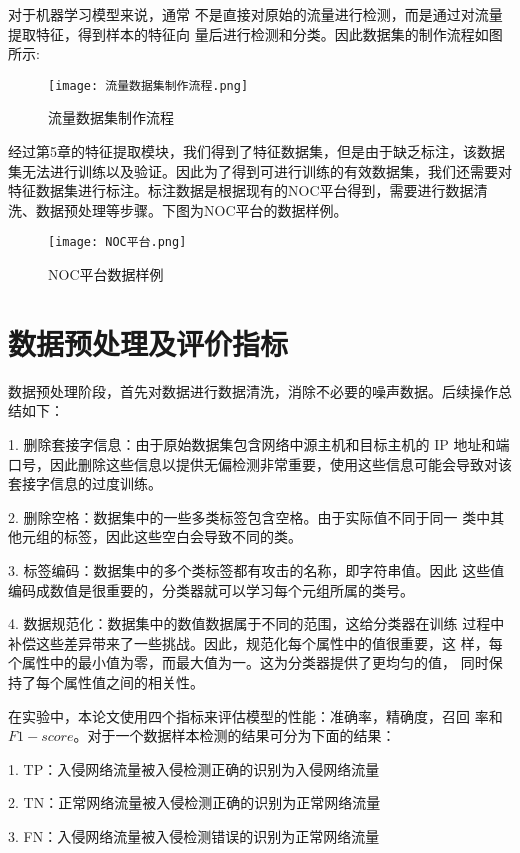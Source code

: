  对于机器学习模型来说，通常
  不是直接对原始的流量进行检测，而是通过对流量提取特征，得到样本的特征向
  量后进行检测和分类。因此数据集的制作流程如图所示:
  \begin{figure}
    \centering
    \texttt{[image: 流量数据集制作流程.png]}
    \caption{流量数据集制作流程}
    \label{fig:flow}
  \end{figure}


经过第5章的特征提取模块，我们得到了特征数据集，但是由于缺乏标注，该数据集无法进行训练以及验证。因此为了得到可进行训练的有效数据集，我们还需要对特征数据集进行标注。标注数据是根据现有的NOC平台得到，需要进行数据清洗、数据预处理等步骤。下图为NOC平台的数据样例。
\begin{figure}
    \centering
    \texttt{[image: NOC平台.png]}
    \caption{NOC平台数据样例}
    \label{fig:NOC}
  \end{figure}

\section{数据预处理及评价指标}
数据预处理阶段，首先对数据进行数据清洗，消除不必要的噪声数据。后续操作总结如下：

1. 删除套接字信息：由于原始数据集包含网络中源主机和目标主机的 IP 地址和端口号，因此删除这些信息以提供无偏检测非常重要，使用这些信息可能会导致对该套接字信息的过度训练。

2. 删除空格：数据集中的一些多类标签包含空格。由于实际值不同于同一
类中其他元组的标签，因此这些空白会导致不同的类。

3. 标签编码：数据集中的多个类标签都有攻击的名称，即字符串值。因此
这些值编码成数值是很重要的，分类器就可以学习每个元组所属的类号。

4. 数据规范化：数据集中的数值数据属于不同的范围，这给分类器在训练
过程中补偿这些差异带来了一些挑战。因此，规范化每个属性中的值很重要，这
样，每个属性中的最小值为零，而最大值为一。这为分类器提供了更均匀的值，
同时保持了每个属性值之间的相关性。

在实验中，本论文使用四个指标来评估模型的性能：准确率，精确度，召回
率和 $F1-score$。对于一个数据样本检测的结果可分为下面的结果：

1. TP：入侵网络流量被入侵检测正确的识别为入侵网络流量

2. TN：正常网络流量被入侵检测正确的识别为正常网络流量

3. FN：入侵网络流量被入侵检测错误的识别为正常网络流量

